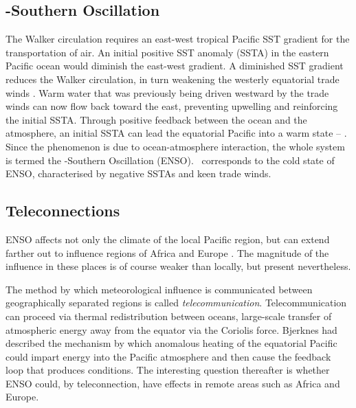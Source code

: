 

\subsection{\elnino-Southern Oscillation}
The Walker circulation requires an east-west tropical Pacific SST gradient for
the transportation of air. An initial positive SST anomaly (SSTA) in the eastern
Pacific ocean would diminish the east-west gradient. A diminished SST gradient
reduces the Walker circulation, in turn weakening the westerly equatorial trade
winds \citep{lindzen1987}. Warm water that was previously being driven westward
by the trade winds can now flow back toward the east, preventing upwelling and
reinforcing the initial SSTA. Through positive feedback between the
ocean and the atmosphere, an initial SSTA can lead the equatorial Pacific
into a warm state -- \elnino. Since the phenomenon is due to ocean-atmosphere
interaction, the whole system is termed the \elnino-Southern Oscillation
(ENSO). {}\nina\ corresponds to the cold state of ENSO, characterised by
negative SSTAs and keen trade winds.


\subsection{Teleconnections}
ENSO affects not only the climate of the local Pacific region, but can extend
farther out to influence regions of Africa and Europe \citep{moron1998}. The
magnitude of the influence in these places is of course weaker than locally, but
present nevertheless.

The method by which meteorological influence is communicated between
geographically separated regions is called
\emph{telecommunication}. Telecommunication can proceed via thermal
redistribution between oceans, large-scale transfer of atmospheric energy away
from the equator via the Coriolis force. Bjerknes had described the mechanism by
which anomalous heating of the equatorial Pacific could impart energy into the
Pacific atmosphere and then cause the feedback loop that produces \elnino{}
conditions. The interesting question thereafter is whether ENSO could, by
teleconnection, have effects in remote areas such as Africa and Europe.

